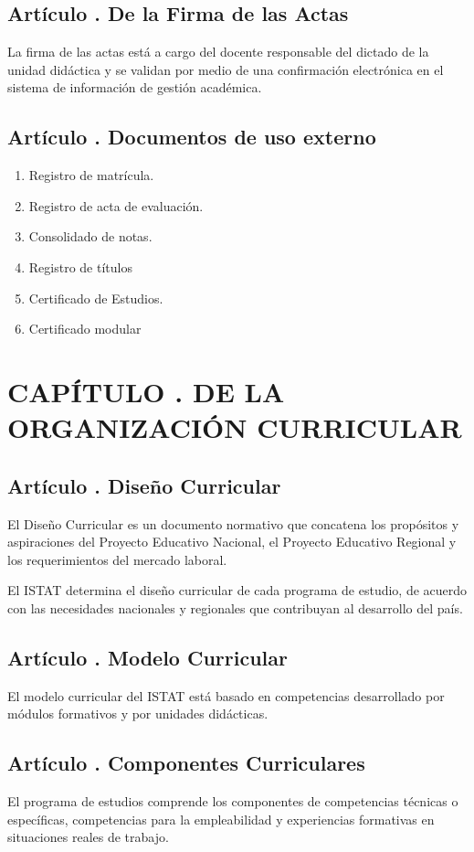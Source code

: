 \subsection{Artículo . De la Firma de las Actas}
\addtocounter{ns}{1}
La firma de las actas está a cargo del docente responsable del dictado de la unidad didáctica y se validan por medio de una confirmación electrónica en el sistema de información de gestión académica. 
\subsection{Artículo . Documentos de uso externo}
\addtocounter{ns}{1}
\begin{enumerate}
\item Registro de matrícula. 
\item Registro de acta de evaluación. 
\item Consolidado de notas. 
\item Registro de títulos 
\item Certificado de Estudios. 
\item Certificado modular
\end{enumerate}
\section{CAPÍTULO . DE LA ORGANIZACIÓN CURRICULAR}
\setcounter{re}{1}

\subsection{Artículo . Diseño Curricular}
\addtocounter{ns}{1}
El Diseño Curricular es un documento normativo que concatena los propósitos y aspiraciones del Proyecto Educativo Nacional, el Proyecto Educativo Regional y los requerimientos del mercado laboral. 

El ISTAT determina el diseño curricular de cada programa de estudio, de acuerdo con las necesidades nacionales y regionales que contribuyan al desarrollo del país. 
\subsection{Artículo . Modelo Curricular}
\addtocounter{ns}{1}
El modelo curricular del ISTAT está basado en competencias desarrollado por módulos formativos y por unidades didácticas.
\subsection{Artículo . Componentes Curriculares}
\addtocounter{ns}{1}
El programa de estudios comprende los componentes de competencias técnicas o específicas, competencias para la empleabilidad y experiencias formativas en situaciones reales de trabajo. 
